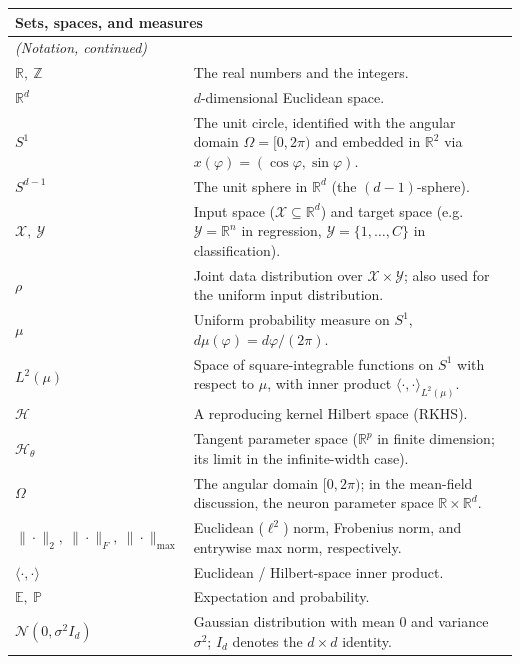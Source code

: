 \begin{longtable}{p{} p{}}

\multicolumn{2}{l}{\textbf{Sets, spaces, and measures}}\\[0.3em]
\endfirsthead
\multicolumn{2}{l}{\small\itshape (Notation, continued)}\\[0.3em]
\endhead

$\mathbb{R},\ \mathbb{Z}$ & The real numbers and the integers. \\[0.4em]
$\mathbb{R}^{d}$ & $d$-dimensional Euclidean space. \\[0.4em]
$S^1$ & The unit circle, identified with the angular domain $\Omega=[0,2\pi)$ and embedded in $\mathbb{R}^2$ via $x(\varphi)=(\cos\varphi,\sin\varphi)$. \\[0.4em]
$S^{d-1}$ & The unit sphere in $\mathbb{R}^d$ (the $(d-1)$-sphere). \\[0.4em]
$\mathcal{X},\ \mathcal{Y}$ & Input space ($\mathcal{X}\subseteq\mathbb{R}^d$) and target space (e.g.\ $\mathcal{Y}=\mathbb{R}^n$ in regression, $\mathcal{Y}=\{1,\dots,C\}$ in classification). \\[0.4em]
$\rho$ & Joint data distribution over $\mathcal{X}\times\mathcal{Y}$; also used for the uniform input distribution. \\[0.4em]
$\mu$ & Uniform probability measure on $S^1$, $d\mu(\varphi)=d\varphi/(2\pi)$. \\[0.4em]
$L^2(\mu)$ & Space of square-integrable functions on $S^1$ with respect to $\mu$, with inner product $\langle\cdot,\cdot\rangle_{L^2(\mu)}$. \\[0.4em]
$\mathcal{H}$ & A reproducing kernel Hilbert space (RKHS). \\[0.4em]
$\mathcal{H}_\theta$ & Tangent parameter space ($\mathbb{R}^p$ in finite dimension; its limit in the infinite-width case). \\[0.4em]
$\Omega$ & The angular domain $[0,2\pi)$; in the mean-field discussion, the neuron parameter space $\mathbb{R}\times\mathbb{R}^d$. \\[0.4em]
$\|\cdot\|_2,\ \|\cdot\|_F,\ \|\cdot\|_{\max}$ & Euclidean ($\ell^2$) norm, Frobenius norm, and entrywise max norm, respectively. \\[0.4em]
$\langle\cdot,\cdot\rangle$ & Euclidean / Hilbert-space inner product. \\[0.4em]
$\mathbb{E},\ \mathbb{P}$ & Expectation and probability. \\[0.4em]
$\mathcal{N}(0,\sigma^2I_d)$ & Gaussian distribution with mean $0$ and variance $\sigma^2$; $I_d$ denotes the $d\times d$ identity. \\[0.6em]


\end{longtable}
